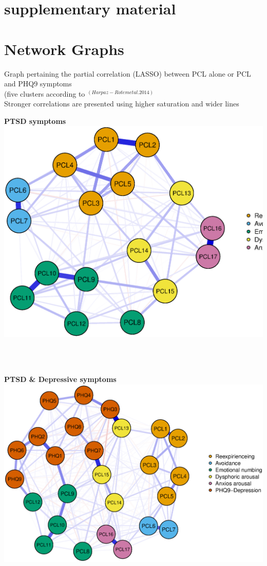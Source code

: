 \documentclass[]{betterposter}
\begin{document}
{\section{supplementary material}
\section{Network Graphs}

Graph pertaining the partial correlation (LASSO) between PCL alone or PCL and PHQ9 symptoms \\
(five clusters according to $^{(Harpaz-Rotem et al. 2014)}$ \\
Stronger correlations are presented using higher saturation and wider lines
\begin{center}
\textbf{PTSD symptoms}
\includegraphics[width=\textwidth]{img/pclOnlyNetwork.eps}
\end{center}
\\

\\
\begin{center}
\textbf{PTSD \& Depressive symptoms}
\includegraphics[width=\textwidth]{img/PCL_PHQ9Network.eps}
\end{center}

}
\end{document}
